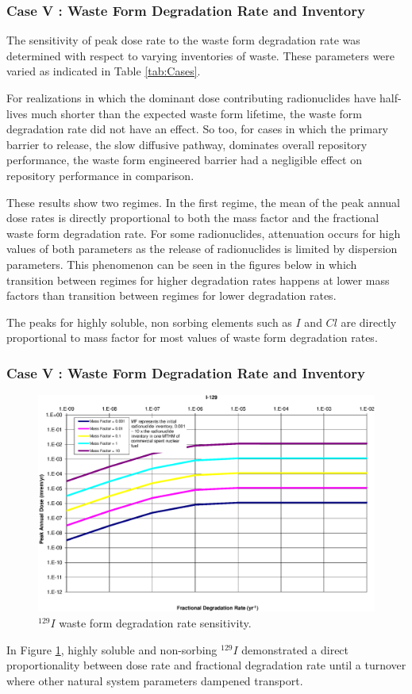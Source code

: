 

\begin{frame}[c]
  \frametitle{Case V : Waste Form Degradation Rate and Inventory}
 The sensitivity of peak dose rate to the waste form degradation rate was 
determined with respect to varying inventories of waste. These parameters were 
varied as indicated in Table \ref{tab:Cases}.

For realizations in which the dominant dose contributing 
radionuclides have half-lives much shorter than the expected waste form lifetime, 
the waste form degradation rate did not have an effect. So too, for 
cases in which the primary barrier to release, the slow diffusive pathway, 
dominates overall repository performance, the waste form engineered barrier
had a negligible effect on repository performance in comparison.

These results show two regimes. In the first regime, the mean of the peak annual 
dose rates is directly proportional to both the mass factor and the fractional 
waste form degradation rate. For some radionuclides, attenuation occurs for high 
values of both parameters as the release of radionuclides is limited by 
dispersion parameters. This phenomenon can be seen in the figures below in which 
transition between regimes for higher degradation rates happens at lower mass 
factors than transition between regimes for lower degradation rates. 

The peaks for highly soluble, non sorbing elements such as $I$ and $Cl$
are directly proportional to mass factor for most 
values of waste form degradation rates. 
\end{frame}

\begin{frame}[c]
  \frametitle{Case V : Waste Form Degradation Rate and Inventory}
\begin{figure}[ht!]
  \centering
  \includegraphics[width=\linewidth]{129IDegRate.eps}
  \caption{$^{129}I$ waste form degradation rate sensitivity.}
  \label{fig:WFDegI129}
\end{figure}
In Figure \ref{fig:WFDegI129}, highly soluble and non-sorbing $^{129}I$ 
demonstrated a direct proportionality between dose rate and fractional 
degradation rate until a turnover where other natural system parameters dampened 
transport.
\end{frame}

